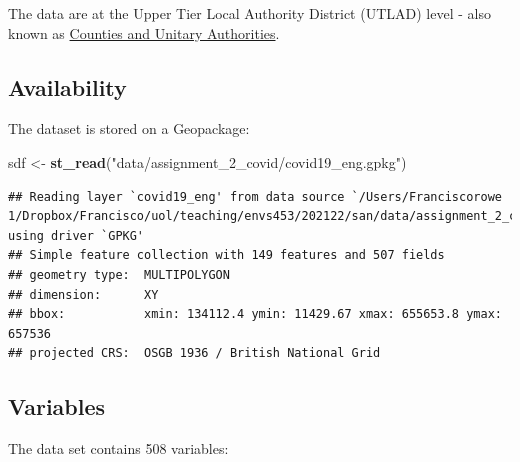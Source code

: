 \documentclass[
]{book}
\newenvironment{Shaded}{\begin{snugshade}}{\end{snugshade}}
\newcommand{\KeywordTok}[1]{\textcolor[rgb]{0.13,0.29,0.53}{\textbf{#1}}}
\newcommand{\NormalTok}[1]{#1}
\newcommand{\StringTok}[1]{\textcolor[rgb]{0.31,0.60,0.02}{#1}}
\begin{document}
The data are at the Upper Tier Local Authority District (UTLAD) level - also known as \href{https://geoportal.statistics.gov.uk/datasets/fe6bcee87d95476abc84e194fe088abb_0}{Counties and Unitary Authorities}.

\hypertarget{availability-1}{%
\subsection*{Availability}\label{availability-1}}

The dataset is stored on a Geopackage:

\begin{Shaded}
\begin{Highlighting}[]
\NormalTok{sdf <-}\StringTok{ }\KeywordTok{st_read}\NormalTok{(}\StringTok{"data/assignment_2_covid/covid19_eng.gpkg"}\NormalTok{)}
\end{Highlighting}
\end{Shaded}

\begin{verbatim}
## Reading layer `covid19_eng' from data source `/Users/Franciscorowe 1/Dropbox/Francisco/uol/teaching/envs453/202122/san/data/assignment_2_covid/covid19_eng.gpkg' using driver `GPKG'
## Simple feature collection with 149 features and 507 fields
## geometry type:  MULTIPOLYGON
## dimension:      XY
## bbox:           xmin: 134112.4 ymin: 11429.67 xmax: 655653.8 ymax: 657536
## projected CRS:  OSGB 1936 / British National Grid
\end{verbatim}

\hypertarget{variables-1}{%
\subsection*{Variables}\label{variables-1}}

The data set contains 508 variables:
\end{document}
